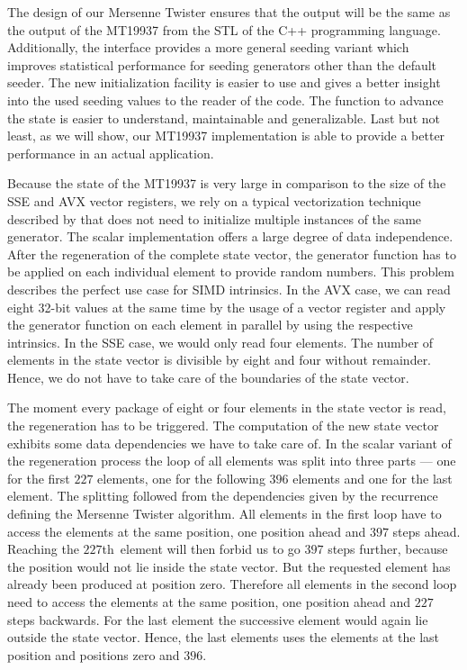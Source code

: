 \documentclass{stdlocal}
\begin{document}
    The design of our Mersenne Twister ensures that the output will be the same as the output of the MT19937 from the STL of the C++ programming language.
    Additionally, the interface provides a more general seeding variant which improves statistical performance for seeding generators other than the default seeder.
    The new initialization facility is easier to use and gives a better {}insight into the used seeding values to the reader of the code.
    The function to advance the state is easier to understand, maintainable and generalizable.
    Last but not least, as we will show, our MT19937 implementation is able to provide a better performance in an actual application.

    Because the state of the MT19937 is very large in comparison to the size of the SSE and AVX vector registers, we rely on a typical vectorization technique described by \textcite{fog2015} that does not need to initialize multiple instances of the same generator.
    The scalar implementation offers a large degree of data independence.
    After the regeneration of the complete state vector, the generator function has to be applied on each individual element to provide random numbers.
    This problem describes the perfect use case for SIMD intrinsics.
    In the AVX case, we can read eight 32-bit values at the same time by the usage of a vector register and apply the generator function on each element in parallel by using the respective intrinsics.
    In the SSE case, we would only read four elements.
    The number of elements in the state vector is divisible by eight and four without remainder.
    Hence, we do not have to take care of the boundaries of the state vector.

    The moment every package of eight or four elements in the state vector is read, the regeneration has to be triggered.
    The computation of the new state vector exhibits some data dependencies we have to take care of.
    In the scalar variant of the regeneration process the loop of all elements was split into three parts --- one for the first $227$ elements, one for the following $396$ elements and one for the last element.
    The splitting followed from the dependencies given by the recurrence defining the Mersenne Twister algorithm.
    All elements in the first loop have to access the elements at the same position, one position ahead and $397$ steps ahead.
    Reaching the $227$th~element will then forbid us to go $397$ steps further, because the position would not lie inside the state vector.
    But the requested element has already been produced at position zero.
    Therefore all elements in the second loop need to access the elements at the same position, one position ahead and $227$ steps backwards.
    For the last element the successive element would again lie outside the state vector.
    Hence, the last elements uses the elements at the last position and positions zero and $396$.
\end{document}
